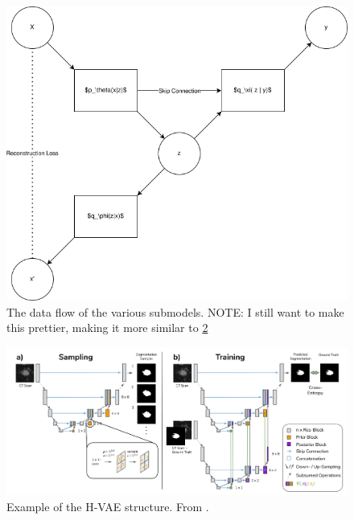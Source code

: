 \begin{figure}[h]
    \begin{minipage}{0.9\textwidth}
        \includegraphics[width=1\textwidth]{figures/model_data_flow.png}
        \caption{The data flow of the various submodels. NOTE: I still want to make this prettier, making it more similar to \ref{fig:hvae-example}}
        \label{fig:seg-vae-schematic}
    \end{minipage}
\end{figure}

\begin{figure}
    \begin{minipage}{0.9\textwidth}
        \includegraphics[width=1\textwidth]{figures/h_vae_structure.png}
        \caption{Example of the H-VAE structure. From \cite{kohl2018probabilistic}.}
        \label{fig:hvae-example}
    \end{minipage}
\end{figure}

